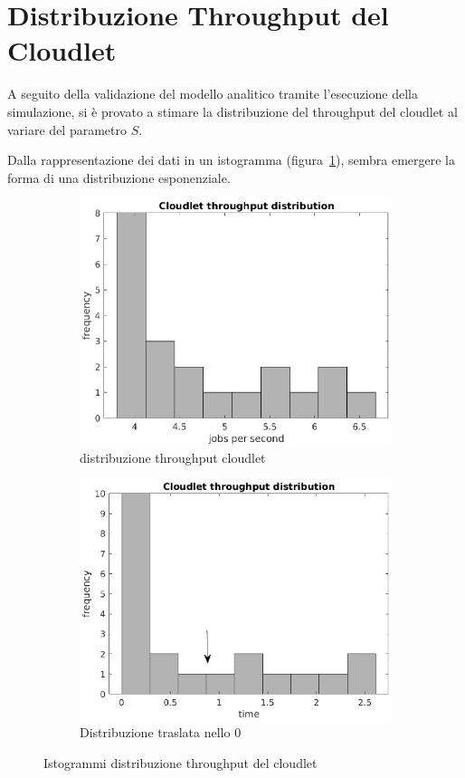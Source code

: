 \section{Distribuzione Throughput del Cloudlet}
A seguito della validazione del modello analitico tramite l'esecuzione della
simulazione, si è provato a stimare la distribuzione del throughput del cloudlet
al variare del parametro $S$.

Dalla rappresentazione dei dati in un istogramma (figura~\ref{thrclet_hist}),
sembra emergere la forma di una distribuzione esponenziale.

\begin{figure}[!h]
\centering
%
\begin{subfigure}[t]{0.49\textwidth}
\includegraphics[width=\textwidth]{figures/thrclet_hist}
\caption{distribuzione throughput cloudlet}
\label{thrclet_hist}
\end{subfigure}
%
\begin{subfigure}[t]{0.49\textwidth}
\includegraphics[width=\textwidth]{figures/thrless_hist}
\caption{Distribuzione traslata nello 0}
\label{15_intperc}
\end{subfigure}
\caption{Istogrammi distribuzione throughput del cloudlet}
%
\end{figure}

